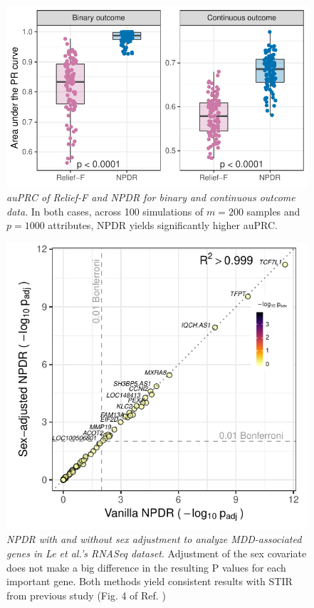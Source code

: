 \documentclass{article}
\begin{document}
\begin{figure}[h]%
\centerline{\includegraphics[]{../figs/pr_compare_100.pdf}}
\caption{\emph{auPRC of Relief-F and NPDR for binary and continuous outcome data}. In both cases, across 100 simulations of $m = 200$ samples and $p = 1000$ attributes, NPDR yields significantly higher auPRC.}
\label{fig:auPRC}
\end{figure}



\begin{figure}[h]%
\centerline{\includegraphics[]{../figs/jerzy_npdrs_mdd.pdf}}
\caption{\emph{NPDR with and without sex adjustment to analyze MDD-associated genes in Le et al.'s RNASeq dataset}. Adjustment of the sex covariate does not make a big difference in the resulting P values for each important gene. Both methods yield consistent results with STIR from previous study (Fig. 4 of Ref. \cite{stir})}
\label{fig:jerzy_npdrs_mdd}
\end{figure}




\end{document}
